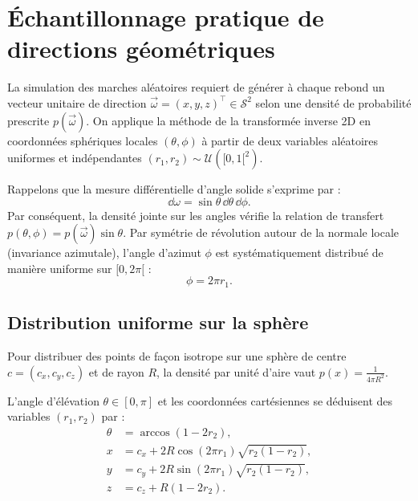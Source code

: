
\section{Échantillonnage pratique de directions géométriques}

La simulation des marches aléatoires requiert de générer à chaque rebond un vecteur unitaire de direction $\vec{\omega} = (x, y, z)^\top \in \mathcal{S}^2$ selon une densité de probabilité prescrite $p(\vec{\omega})$. On applique la méthode de la transformée inverse 2D en coordonnées sphériques locales $(\theta, \phi)$ à partir de deux variables aléatoires uniformes et indépendantes $(r_1, r_2) \sim \mathcal{U}([0, 1[^2)$.

Rappelons que la mesure différentielle d'angle solide s'exprime par :
\begin{equation}
    \dd\omega = \sin\theta \, \dd\theta \, \dd\phi.
\end{equation}
Par conséquent, la densité jointe sur les angles vérifie la relation de transfert $p(\theta, \phi) = p(\vec{\omega}) \sin\theta$. Par symétrie de révolution autour de la normale locale (invariance azimutale), l'angle d'azimut $\phi$ est systématiquement distribué de manière uniforme sur $[0, 2\pi[$ :
\begin{equation}
    \phi = 2\pi r_1.
\end{equation}

\subsection{Distribution uniforme sur la sphère}

Pour distribuer des points de façon isotrope sur une sphère de centre $c = (c_x, c_y, c_z)$ et de rayon $R$, la densité par unité d'aire vaut $p(x) = \frac{1}{4\pi R^2}$.

\begin{proposition}
    L'angle d'élévation $\theta \in [0, \pi]$ et les coordonnées cartésiennes se déduisent des variables $(r_1, r_2)$ par :
    \begin{align}
        \theta &= \arccos(1 - 2r_2), \\
        x &= c_x + 2R \cos(2\pi r_1) \sqrt{r_2(1 - r_2)}, \\
        y &= c_y + 2R \sin(2\pi r_1) \sqrt{r_2(1 - r_2)}, \\
        z &= c_z + R(1 - 2r_2).
    \end{align}
\end{proposition}

